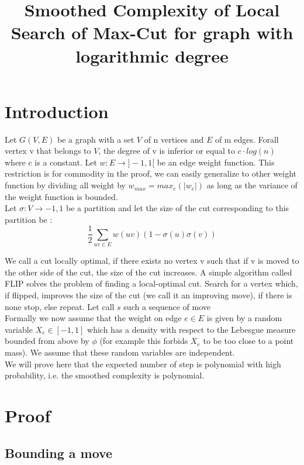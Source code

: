 \documentclass[12pt]{article}
\title{Smoothed Complexity of Local Search of Max-Cut for graph with logarithmic degree}
\begin{document}
\maketitle

\section{Introduction}

Let $G(V,E)$ be a graph with a set $V$ of n vertices and $E$ of m edges. Forall vertex v that belongs to $V$, the degree of v is inferior or equal to $c \cdot log(n)$ where c is a constant. Let $ w : E \rightarrow ]-1, 1[$ be an edge weight function. This restriction is for commodity in the proof, we can easily generalize to other weight function by dividing all weight by $w_{max} = max_e (|w_e|)$ as long as the variance of the weight function is bounded. \\
Let $\sigma : V \rightarrow {-1,1}$ be a partition and let the size of the cut corresponding to this partition be :
\begin{equation*}
\dfrac{1}{2}\sum_{uv \in E} {w(uv)(1 - \sigma(u)\sigma(v)) }
\end{equation*}

We call a cut locally optimal, if there exists no vertex v such that if v is moved to the other side of the cut, the size of the cut increases. 
A simple algorithm called FLIP solves the problem of finding a local-optimal cut. Search for a vertex which, if flipped, improves the size of the cut (we call it an improving move), if there is none stop, else repeat. Let call $s$ such a sequence of move \\

Formally we now assume that the weight on edge $e \in E$ is given by a random variable $X_e \in [-1,1]$ which has a density with respect to the Lebesgue measure bounded from above by $\phi$ (for example this forbids $X_e$ to be too close to a point mass). We assume that these random variables are independent.\\
We will prove here that the expected number of step is polynomial with high probability, i.e. the smoothed complexity is polynomial. 


\section{Proof}
\subsection{Bounding a move}
\end{document}
